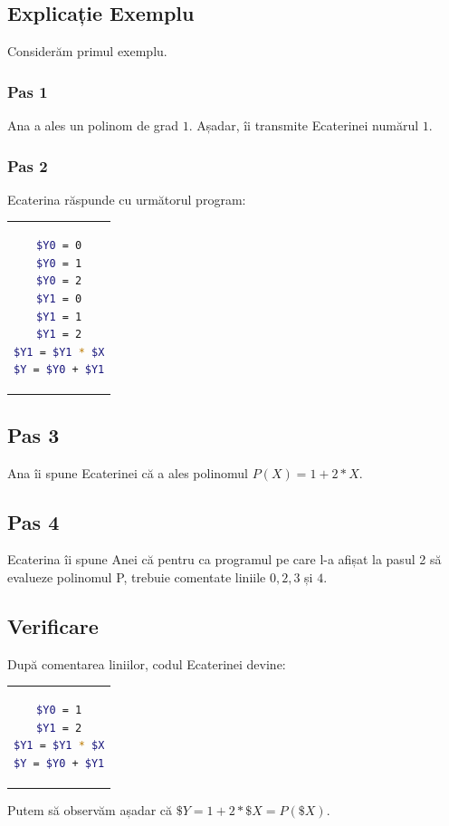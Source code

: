 \documentclass[12pt,a4paper]{article}
\begin{document}
\subsection*{Explicație Exemplu}

Considerăm primul exemplu.

\subsubsection*{Pas 1}

Ana a ales un polinom de grad $1$. Așadar, îi transmite Ecaterinei numărul $1$.

\subsubsection*{Pas 2}

Ecaterina răspunde cu următorul program:
\begin{center}
\begin{tabular}{c}
\begin{lstlisting}[language=Bash]
$Y0 = 0
$Y0 = 1
$Y0 = 2
$Y1 = 0
$Y1 = 1
$Y1 = 2
$Y1 = $Y1 * $X
$Y = $Y0 + $Y1
\end{lstlisting}
\end{tabular}
\end{center}

\subsection*{Pas 3}

Ana îi spune Ecaterinei că a ales polinomul $P(X) = 1 + 2*X$.

\subsection*{Pas 4}

Ecaterina îi spune Anei că pentru ca programul pe care l-a afișat la pasul 2 să evalueze polinomul P, trebuie comentate liniile $0, 2, 3$ și $4$.

\subsection*{Verificare}

După comentarea liniilor, codul Ecaterinei devine:
\begin{center}
\begin{tabular}{c}
\begin{lstlisting}[language=Bash]
$Y0 = 1
$Y1 = 2
$Y1 = $Y1 * $X
$Y = $Y0 + $Y1
\end{lstlisting}
\end{tabular}
\end{center}

Putem să observăm așadar că $\$Y = 1 + 2 * \$X = P(\$X)$. 
\end{document}

